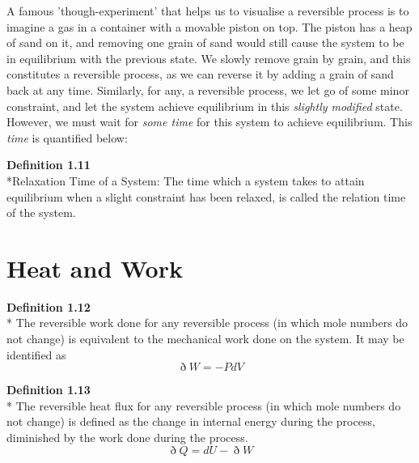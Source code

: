 \documentclass[oneside]{book}
\begin{document}
A famous 'though-experiment' that helps us to visualise a reversible process is to imagine a gas in a container with a movable piston on top. The piston has a heap of sand on it, and removing one grain of sand would still cause the system to be in equilibrium with the previous state. We slowly remove grain by grain, and this constitutes a reversible process, as we can reverse it by adding a grain of sand back at any time. Similarly, for any, a reversible process, we let go of some minor constraint, and let the system achieve equilibrium in this \emph{slightly modified} state. However, we must wait for \emph{some time} for this system to achieve equilibrium. This \emph{time} is quantified below:

\begin{mdframed}[style=exercise]
\textbf{Definition 1.11}
 \\*Relaxation Time of a System: The time which a system takes to attain equilibrium when a slight constraint has been relaxed, is called the relation time of the system. \\ 
\end{mdframed}

\section{Heat and Work}
\begin{mdframed}[style=exercise]
\textbf{Definition 1.12}
 \\* The reversible work done for any reversible process (in which mole numbers do not change) is equivalent to the mechanical work done on the system. It may be identified as
\[ \eth W = -PdV\]
\end{mdframed}

\begin{mdframed}[style=exercise]
\textbf{Definition 1.13}
 \\* The reversible heat flux for any reversible process (in which mole numbers do not change) is defined as the change in internal energy during the process, diminished by the work done during the process. 
\[ \eth Q = dU - \eth W\]
\end{mdframed}
\end{document}
